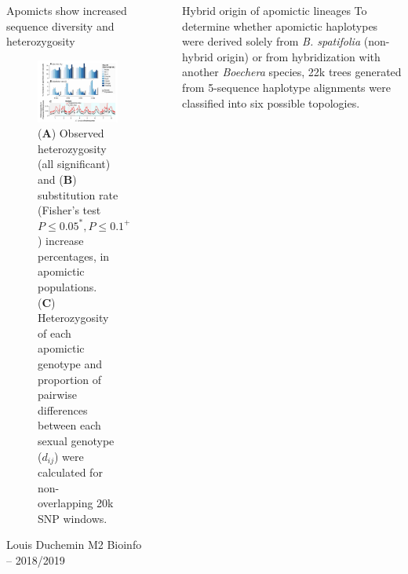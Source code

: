 \documentclass[final,20pt]{beamer}
\newlength{\sepwidth}
\newlength{\colwidth}
\newcommand{\separatorcolumn}{\begin{column}{\sepwidth}\end{column}}
\begin{document}
\begin{frame}[t]
\begin{columns}[t]
\begin{column}{\colwidth}
\begin{block}{Apomicts show increased sequence diversity and heterozygosity}
    \begin{figure}
      \includegraphics[width=\textwidth]{./fig2.png}
      \caption{(\textbf{A}) Observed heterozygosity (all significant) and (\textbf{B}) substitution rate 
      (Fisher's test $P \leq 0.05^*, P \leq 0.1^+$) increase 
      percentages, in apomictic populations. \\
      (\textbf{C}) Heterozygosity of each apomictic
      genotype and proportion of pairwise differences between each sexual genotype ($d_{ij}$) were calculated for non-
      overlapping 20k SNP windows.
      }
      
    \end{figure}
  \end{block}
  \vfill
  \small{Louis Duchemin M2 Bioinfo -- 2018/2019}
\end{column}

\separatorcolumn

\begin{column}{\colwidth}
  \begin{block}{Hybrid origin of apomictic lineages}
    To determine whether apomictic haplotypes were derived solely from \textit{B. spatifolia} (non-hybrid origin) 
    or from hybridization with another \textit{Boechera} species, 
    22k trees generated from 5-sequence haplotype alignments were classified into six possible topologies.


\end{block}
\end{column}
\end{columns}
\end{frame}
\end{document}
